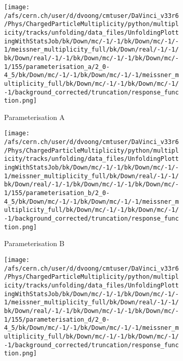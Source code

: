 \begin{figure}[H]
	\centering
	\begin{subfigure}{0.49\textwidth}
		\texttt{[image: /afs/cern.ch/user/d/dvoong/cmtuser/DaVinci\_v33r6/Phys/ChargedParticleMultiplicity/python/multiplicity/tracks/unfolding/data\_files/UnfoldingPlottingWithStatsJob/bk/Down/mc/-1/-1/bk/Down/mc/-1/-1/meissner\_multiplicity\_full/bk/Down/real/-1/-1/bk/Down/real/-1/-1/bk/Down/mc/-1/-1/bk/Down/mc/-1/155/parameterisation\_a/2\_0-4\_5/bk/Down/mc/-1/-1/bk/Down/mc/-1/-1/meissner\_multiplicity\_full/bk/Down/mc/-1/-1/bk/Down/mc/-1/-1/background\_corrected/truncation/response\_function.png]}
		\caption{Parameterisation A}
	\end{subfigure}
	\begin{subfigure}{0.49\textwidth}
		\texttt{[image: /afs/cern.ch/user/d/dvoong/cmtuser/DaVinci\_v33r6/Phys/ChargedParticleMultiplicity/python/multiplicity/tracks/unfolding/data\_files/UnfoldingPlottingWithStatsJob/bk/Down/mc/-1/-1/bk/Down/mc/-1/-1/meissner\_multiplicity\_full/bk/Down/real/-1/-1/bk/Down/real/-1/-1/bk/Down/mc/-1/-1/bk/Down/mc/-1/155/parameterisation\_b/2\_0-4\_5/bk/Down/mc/-1/-1/bk/Down/mc/-1/-1/meissner\_multiplicity\_full/bk/Down/mc/-1/-1/bk/Down/mc/-1/-1/background\_corrected/truncation/response\_function.png]}
		\caption{Parameterisation B}
	\end{subfigure}
	\begin{subfigure}{0.49\textwidth}
		\texttt{[image: /afs/cern.ch/user/d/dvoong/cmtuser/DaVinci\_v33r6/Phys/ChargedParticleMultiplicity/python/multiplicity/tracks/unfolding/data\_files/UnfoldingPlottingWithStatsJob/bk/Down/mc/-1/-1/bk/Down/mc/-1/-1/meissner\_multiplicity\_full/bk/Down/real/-1/-1/bk/Down/real/-1/-1/bk/Down/mc/-1/-1/bk/Down/mc/-1/155/parameterisation\_d/2\_0-4\_5/bk/Down/mc/-1/-1/bk/Down/mc/-1/-1/meissner\_multiplicity\_full/bk/Down/mc/-1/-1/bk/Down/mc/-1/-1/background\_corrected/truncation/response\_function.png]}

\end{subfigure}
\end{figure}

